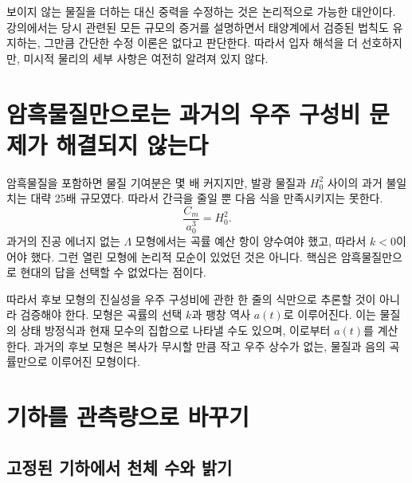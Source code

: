 보이지 않는 물질을 더하는 대신 중력을 수정하는 것은 논리적으로 가능한 대안이다. 강의에서는 당시 관련된 모든 규모의 증거를 설명하면서 태양계에서 검증된 법칙도 유지하는, 그만큼 간단한 수정 이론은 없다고 판단한다. 따라서 입자 해석을 더 선호하지만, 미시적 물리의 세부 사항은 여전히 알려져 있지 않다.

\section{암흑물질만으로는 과거의 우주 구성비 문제가 해결되지 않는다}

암흑물질을 포함하면 물질 기여분은 몇 배 커지지만, 발광 물질과 \(H_0^2\) 사이의 과거 불일치는 대략 25배 규모였다. 따라서 간극을 줄일 뿐 다음 식을 만족시키지는 못한다.
\begin{equation}
\frac{C_m}{a_0^3}=H_0^2.
\end{equation}
과거의 진공 에너지 없는 \(\Lambda\) 모형에서는 곡률 예산 항이 양수여야 했고, 따라서 \(k<0\)이어야 했다. 그런 열린 모형에 논리적 모순이 있었던 것은 아니다. 핵심은 암흑물질만으로 현대의 답을 선택할 수 없었다는 점이다.

\begin{classroomqa}
\end{classroomqa}

따라서 후보 모형의 진실성을 우주 구성비에 관한 한 줄의 식만으로 추론할 것이 아니라 검증해야 한다. 모형은 곡률의 선택 \(k\)과 팽창 역사 \(a(t)\)로 이루어진다. 이는 물질의 상태 방정식과 현재 모수의 집합으로 나타낼 수도 있으며, 이로부터 \(a(t)\)를 계산한다. 과거의 후보 모형은 복사가 무시할 만큼 작고 우주 상수가 없는, 물질과 음의 곡률만으로 이루어진 모형이다.

\section{기하를 관측량으로 바꾸기}

\subsection{고정된 기하에서 천체 수와 밝기}

